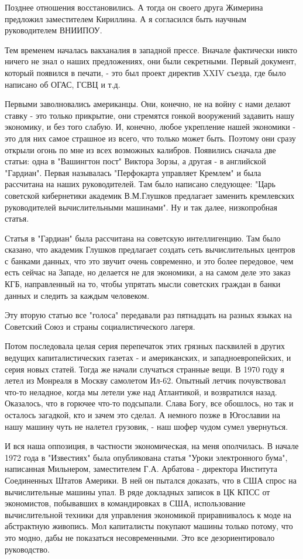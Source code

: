 Позднее отношения восстановились. А тогда он своего друга Жимерина предложил
заместителем Кириллина. А я согласился быть научным руководителем ВНИИПОУ.

Тем временем началась вакханалия в западной прессе. Вначале фактически никто
ничего не знал о наших предложениях, они были секретными. Первый документ,
который появился в печати, - это был проект директив XXIV съезда, где было
написано об ОГАС, ГСВЦ и т.д.

Первыми заволновались американцы. Они, конечно, не на войну с нами делают ставку
- это только прикрытие, они стремятся гонкой вооружений задавить нашу экономику,
и без того слабую. И, конечно, любое укрепление нашей экономики - это для них
самое страшное из всего, что только может быть. Поэтому они сразу открыли огонь
по мне из всех возможных калибров. Появились сначала две статьи: одна в
"Вашингтон пост" Виктора Зорзы, а другая - в английской "Гардиан". Первая
называлась "Перфокарта управляет Кремлем" и была рассчитана на наших
руководителей. Там было написано следующее: "Царь советской кибернетики академик
В.М.Глушков предлагает заменить кремлевских руководителей вычислительными
машинами". Ну и так далее, низкопробная статья.

Статья в "Гардиан" была рассчитана на советскую интеллигенцию. Там было сказано,
что академик Глушков предлагает создать сеть вычислительных центров с банками
данных, что это звучит очень современно, и это более передовое, чем есть сейчас
на Западе, но делается не для экономики, а на самом деле это заказ КГБ,
направленный на то, чтобы упрятать мысли советских граждан в банки данных и
следить за каждым человеком.

Эту вторую статью все "голоса" передавали раз пятнадцать на разных языках на
Советский Союз и страны социалистического лагеря.

Потом последовала целая серия перепечаток этих грязных пасквилей в других
ведущих капиталистических газетах - и американских, и западноевропейских, и
серия новых статей. Тогда же начали случаться странные вещи. В 1970 году я летел
из Монреаля в Москву самолетом Ил-62. Опытный летчик почувствовал что-то
неладное, когда мы летели уже над Атлантикой, и возвратился назад. Оказалось,
что в горючее что-то подсыпали. Слава Богу, все обошлось, но так и осталось
загадкой, кто и зачем это сделал. А немного позже в Югославии на нашу машину
чуть не налетел грузовик, - наш шофер чудом сумел увернуться.

И вся наша оппозиция, в частности экономическая, на меня ополчилась. В начале
1972 года в "Известиях" была опубликована статья "Уроки электронного бума",
написанная Мильнером, заместителем Г.А. Арбатова - директора Института
Соединенных Штатов Америки. В ней он пытался доказать, что в США спрос на
вычислительные машины упал. В ряде докладных записок в ЦК КПСС от экономистов,
побывавших в командировках в США, использование вычислительной техники для
управления экономикой приравнивалось к моде на абстрактную живопись. Мол
капиталисты покупают машины только потому, что это модно, дабы не показаться
несовременными. Это все дезориентировало руководство.

